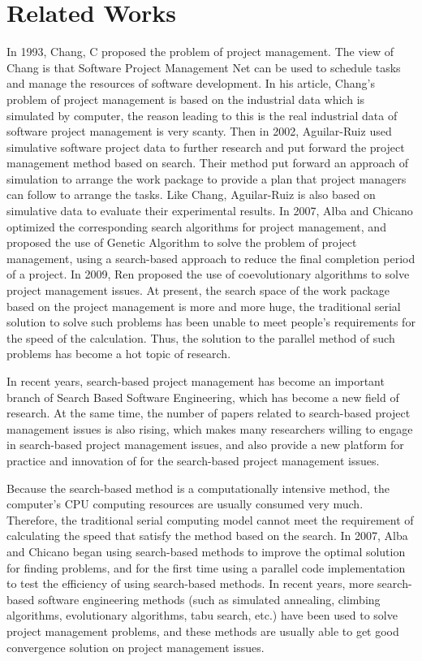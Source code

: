 
\section{Related Works}
%
In 1993, Chang, C proposed the problem of project management. The view of 
Chang is that Software Project Management Net can be used to schedule tasks 
and manage the resources of software development. In his article, Chang's 
problem of project management is based on the industrial data which is 
simulated by computer, the reason leading to this is the real industrial data 
of software project management is very scanty. Then in 2002, Aguilar-Ruiz 
used simulative software project data to further research and put forward the 
project management method based on search. Their method put forward an 
approach of simulation to arrange the work package to provide a plan that 
project managers can follow to arrange the tasks\cite{alba}. Like Chang, 
Aguilar-Ruiz is also based on simulative data to evaluate their experimental
results. In 2007, Alba and Chicano optimized the corresponding search algorithms
for project management, and proposed the use of Genetic Algorithm to solve the 
problem of project management, using a search-based approach to reduce the 
final completion period of a project. In 2009, Ren proposed the use of 
coevolutionary algorithms to solve project management issues\cite{ren}. At 
present, the search space of the work package based on the project management
is more and more huge, the traditional serial solution to solve such problems
has been unable to meet people's requirements for the speed of the calculation. 
Thus, the solution to the parallel method of such problems has become a hot 
topic of research\cite{pentico}.


In recent years, search-based project management has become an important 
branch of Search Based Software Engineering, which has become a new field of 
research. At the same time, the number of papers related to search-based 
project management issues is also rising, which makes many researchers 
willing to engage in search-based project management issues, and also provide 
a new platform for practice and innovation of for the search-based project 
management issues\cite{penta}.


Because the search-based method is a computationally intensive method, the 
computer's CPU computing resources are usually consumed very much. Therefore, 
the traditional serial computing model cannot meet the requirement of 
calculating the speed that satisfy the method based on the search. In 2007, 
Alba and Chicano began using search-based methods to improve the optimal 
solution for finding problems, and for the first time using a parallel code 
implementation to test the efficiency of using search-based methods\cite{pospichal}.
In recent years, more search-based software engineering methods (such as 
simulated annealing, climbing algorithms, evolutionary algorithms, tabu 
search, etc.) have been used to solve project management problems, and these 
methods are usually able to get good convergence solution on project 
management issues.


